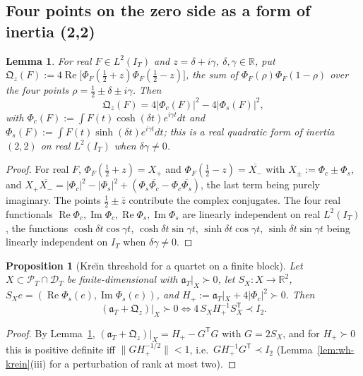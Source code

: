 \documentclass[11pt]{amsart}
\newtheorem{proposition}[theorem]{Proposition}
\newtheorem{lemma}[theorem]{Lemma}
\theoremstyle{definition}
\theoremstyle{remark}
\newcommand{\R}{\mathbb R}
\newcommand{\Rel}{\operatorname{Re}}
\newcommand{\Iml}{\operatorname{Im}}
\newcommand{\PT}{\mathcal P_T}
\newcommand{\IT}{I_T}
\begin{document}
\subsection{Four points on the zero side as a form of inertia (2,2)}\label{subsec:wh-quartet}

\begin{lemma}\label{lem:wh-Q}
For real $F\in L^2(\IT)$ and $z=\delta+i\gamma$, $\delta,\gamma\in\R$, put
$\mathfrak Q_z(F):=4\Rel\big[\Phi_F(\tfrac12+z)\Phi_F(\tfrac12-z)\big]$, the sum of $\Phi_F(\rho)\Phi_F(1-\rho)$ over the four
points $\rho=\frac12\pm\delta\pm i\gamma$. Then
\[
\mathfrak Q_z(F)=4|\Phi_c(F)|^2-4|\Phi_s(F)|^2,
\]
with $\Phi_c(F):=\int F(t)\cosh(\delta t)e^{i\gamma t}dt$ and $\Phi_s(F):=\int F(t)\sinh(\delta t)e^{i\gamma t}dt$; this is
a real quadratic form of inertia $(2,2)$ on real $L^2(\IT)$ when $\delta\gamma\ne0$.
\end{lemma}

\begin{proof}
For real $F$, $\Phi_F(\frac12+z)=X_+$ and $\Phi_F(\frac12-z)=\overline{X_-}$ with $X_\pm:=\Phi_c\pm\Phi_s$, and
$X_+\overline{X_-}=|\Phi_c|^2-|\Phi_s|^2+(\Phi_s\overline{\Phi_c}-\Phi_c\overline{\Phi_s})$, the last term being purely imaginary.
The points $\frac12\pm\bar z$ contribute the complex conjugates. The four real functionals
$\Rel\Phi_c,\Iml\Phi_c,\Rel\Phi_s,\Iml\Phi_s$ are linearly independent on real $L^2(\IT)$, the functions
$\cosh\delta t\cos\gamma t$, $\cosh\delta t\sin\gamma t$, $\sinh\delta t\cos\gamma t$, $\sinh\delta t\sin\gamma t$ being linearly
independent on $\IT$ when $\delta\gamma\ne0$.
\end{proof}

\begin{proposition}[Kre\u{\i}n threshold for a quartet on a finite block]\label{prop:wh-K}
Let $X\subset\PT\cap\mathcal D_T$ be finite-dimensional with $\mathfrak a_T|_X\succ0$, let $S_X:X\to\R^2$,
$S_Xe=(\Rel\Phi_s(e),\Iml\Phi_s(e))$, and $H_+:=\mathfrak a_T|_X+4|\Phi_c|^2\succ0$. Then
\[
(\mathfrak a_T+\mathfrak Q_z)|_X\succ0\iff 4\,S_XH_+^{-1}S_X^{\mathsf T}\prec I_2 .
\]
\end{proposition}

\begin{proof}
By Lemma~\ref{lem:wh-Q}, $(\mathfrak a_T+\mathfrak Q_z)|_X=H_+-G^{\mathsf T}G$ with $G=2S_X$, and for $H_+\succ0$ this is positive
definite iff $\|GH_+^{-1/2}\|<1$, i.e.\ $GH_+^{-1}G^{\mathsf T}\prec I_2$ (Lemma~\ref{lem:wh-krein}(iii) for a perturbation of
rank at most two).
\end{proof}
\end{document}
